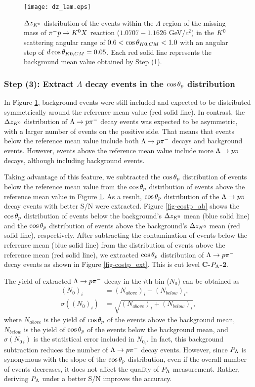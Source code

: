 \begin{figure}[h]
  \centering
  \texttt{[image: dz\_lam.eps]}
  \caption{$\Delta z_{K^{0}}$ distribution of the events within the $\Lambda$ region of the missing mass of $\pi^- p \to K^0 X$ reaction ($1.0707-1.1626$ GeV/$c^{2}$) in the $K^{0}$ scattering angular range of $0.6<\cos{\theta_{K0,CM}}<1.0$ with an angular step of $d\cos{\theta_{K0,CM}}=0.05$. Each red solid line represents the background mean value obtained by Step (1).}
  \label{fig-dz_lam}
\end{figure}


\subsubsection{Step (3): Extract $\Lambda$ decay events in the $\cos{\theta_p}$ distribution}
\label{subsubsec-extcostp}

In Figure \ref{fig-dz_lam}, background events were still included and expected to be distributed symmetrically around the reference mean value (red solid line). In contrast, the $\Delta z_{K^{0}}$ distribution of $\Lambda\to p\pi^{-}$ decay events was expected to be asymmetric, with a larger number of events on the positive side. That means that events below the reference mean value include both $\Lambda\to p\pi^{-}$ decays and background events. However, events above the reference mean value include more $\Lambda\to p\pi^{-}$ decays, although including background events.

Taking advantage of this feature, we subtracted the $\cos{\theta_p}$ distribution of events below the reference mean value from the $\cos{\theta_p}$ distribution of events above the reference mean value in Figure \ref{fig-dz_lam}. As a result, $\cos{\theta_p}$ distribution of the $\Lambda\to p\pi^{-}$ decay events with better S/N were extracted. Figure \ref{fig-costp_ab} shows the $\cos{\theta_p}$ distribution of events below the background's $\Delta z_{K^{0}}$ mean (blue solid line) and the $\cos{\theta_p}$ distribution of events above the background's $\Delta z_{K^{0}}$ mean (red solid line), respectively. After subtracting the contamination of events below the reference mean (blue solid line) from the distribution of events above the reference mean (red solid line), we extracted $\cos{\theta_p}$ distribution of $\Lambda\to p\pi^{-}$ decay events as shown in Figure \ref{fig-costp_ext}. This is cut level {\bf C-$P_{\Lambda}$-2}.

The yield of extracted $\Lambda\to p\pi^{-}$ decay in the $i$th bin ($N_0$) can be obtained as
\begin{align}
  (N_{0})_i &= (N_{above})_i - (N_{below})_i, \\
  \sigma((N_{0})_i) &= \sqrt{(N_{above})_i + (N_{below})_i},
\end{align}
where $N_{above}$ is the yield of $\cos{\theta_p}$ of the events above the background mean, $N_{below}$ is the yield of $\cos{\theta_p}$ of the events below the background mean, and $\sigma(N_{0\ i})$ is the statistical error included in $N_{0_i}$. In fact, this background subtraction reduces the number of $\Lambda\to p\pi^{-}$ decay events. However, since $P_{\Lambda}$ is synonymous with the slope of the $\cos{\theta_p}$ distribution, even if the overall number of events decreases, it does not affect the quality of $P_{\Lambda}$ measurement. Rather, deriving $P_{\Lambda}$ under a better S/N improves the accuracy.

